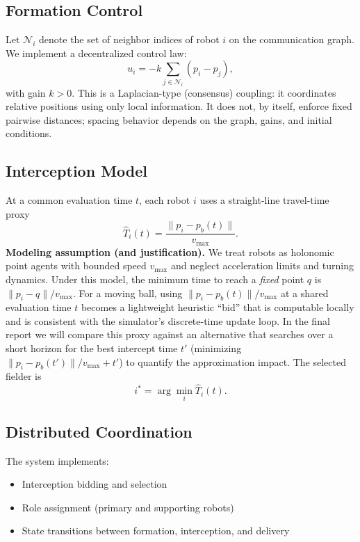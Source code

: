 \documentclass[conference]{IEEEtran}
\begin{document}
\subsection{Formation Control}

Let $\mathcal{N}_i$ denote the set of neighbor indices of robot $i$ on the communication graph. We implement a decentralized control law:
\begin{equation}
u_i = -k \sum_{j \in \mathcal{N}_i} (p_i - p_j) ,
\label{eq:formation-law}
\end{equation}
with gain $k > 0$. This is a Laplacian-type (consensus) coupling: it coordinates relative positions using only local information. It does not, by itself, enforce fixed pairwise distances; spacing behavior depends on the graph, gains, and initial conditions.

\subsection{Interception Model}

At a common evaluation time $t$, each robot $i$ uses a straight-line travel-time proxy
\begin{equation}
\widehat{T}_i(t) = \frac{\|p_i - p_b(t)\|}{v_{\max}} .
\label{eq:Ti-hat}
\end{equation}
\noindent\textbf{Modeling assumption (and justification).} We treat robots as holonomic point agents with bounded speed \(v_{\max}\) and neglect acceleration limits and turning dynamics. Under this model, the minimum time to reach a \emph{fixed} point \(q\) is \(\|p_i-q\|/v_{\max}\). For a moving ball, using \(\|p_i-p_b(t)\|/v_{\max}\) at a shared evaluation time \(t\) becomes a lightweight heuristic ``bid'' that is computable locally and is consistent with the simulator's discrete-time update loop. In the final report we will compare this proxy against an alternative that searches over a short horizon for the best intercept time \(t'\) (minimizing \(\|p_i-p_b(t')\|/v_{\max}+t'\)) to quantify the approximation impact.
\noindent The selected fielder is
\begin{equation}
i^\ast = \arg\min_i \widehat{T}_i(t) .
\label{eq:istar}
\end{equation}

\subsection{Distributed Coordination}

The system implements:
\begin{itemize}
    \item Interception bidding and selection
    \item Role assignment (primary and supporting robots)
    \item State transitions between formation, interception, and delivery
\end{itemize}
\end{document}
